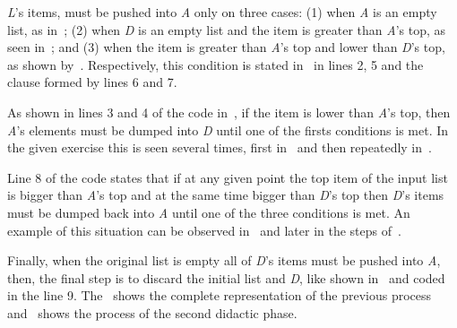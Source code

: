 \emph{L}'s items, must be pushed into \emph{A} only on three cases:
(1) when \emph{A} is an empty list, as
in~; (2) when \emph{D} is an empty list
and the item is greater than \emph{A}'s top, as seen
in~; and (3) when the item is greater
than \emph{A}'s top and lower than \emph{D}'s top, as shown
by~. Respectively, this condition is
stated in~ in lines 2, 5 and the clause formed by
lines 6 and 7.

As shown in lines 3 and 4 of the code in~, if the
item is lower than \emph{A}'s top, then \emph{A}'s elements must be
dumped into \emph{D} until one of the firsts conditions is met. In the
given exercise this is seen several times, first
in~ and then repeatedly
in~.

Line 8 of the code states
that if at any given point the top item of the input list is bigger
than \emph{A}'s top and at the same time bigger than \emph{D}'s top
then \emph{D}'s items must be dumped back into \emph{A} until one
of the three conditions is met. An example of this situation can be
observed in~ and later in the steps
of~.

Finally, when the original list is empty all of \emph{D}'s items must
be pushed into \emph{A}, then, the final step is to discard the
initial list and \emph{D}, like shown
in~ and coded in the line 9.
The~ shows the complete \erlang representation of
the previous process and~ shows the process of the
second didactic phase.

\FloatBarrier
